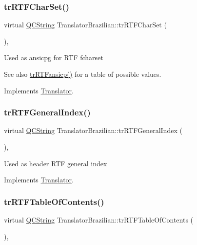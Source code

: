 \subsubsection{\texorpdfstring{trRTFCharSet()}{trRTFCharSet()}}
{\footnotesize\ttfamily virtual \mbox{\hyperlink{class_q_c_string}{Q\+C\+String}} Translator\+Brazilian\+::tr\+R\+T\+F\+Char\+Set (\begin{DoxyParamCaption}{ }\end{DoxyParamCaption})\hspace{0.3cm}{\ttfamily [inline]}, {\ttfamily [virtual]}}

Used as ansicpg for R\+TF fcharset \begin{DoxySeeAlso}{See also}
\mbox{\hyperlink{class_translator_brazilian_aeaeb16bc0bff2e8c053a3746892711d4}{tr\+R\+T\+Fansicp()}} for a table of possible values. 
\end{DoxySeeAlso}


Implements \mbox{\hyperlink{class_translator_afad391f3cbfb5ce6332b7239f8e2049a}{Translator}}.

\mbox{\label{class_translator_brazilian_a95c60e49063efadf2d8bd2da28efe509}} 
\subsubsection{\texorpdfstring{trRTFGeneralIndex()}{trRTFGeneralIndex()}}
{\footnotesize\ttfamily virtual \mbox{\hyperlink{class_q_c_string}{Q\+C\+String}} Translator\+Brazilian\+::tr\+R\+T\+F\+General\+Index (\begin{DoxyParamCaption}{ }\end{DoxyParamCaption})\hspace{0.3cm}{\ttfamily [inline]}, {\ttfamily [virtual]}}

Used as header R\+TF general index 

Implements \mbox{\hyperlink{class_translator}{Translator}}.

\mbox{\label{class_translator_brazilian_a79aeba051d21a911a0336bb998b012f0}} 
\subsubsection{\texorpdfstring{trRTFTableOfContents()}{trRTFTableOfContents()}}
{\footnotesize\ttfamily virtual \mbox{\hyperlink{class_q_c_string}{Q\+C\+String}} Translator\+Brazilian\+::tr\+R\+T\+F\+Table\+Of\+Contents (\begin{DoxyParamCaption}{ }\end{DoxyParamCaption})\hspace{0.3cm}{\ttfamily [inline]}, {\ttfamily [virtual]}}

